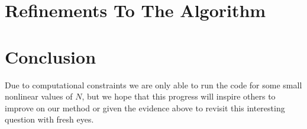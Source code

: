 \documentclass{article}
\begin{document}
\section{Refinements To The Algorithm} \label{sec:refinements}


\section{Conclusion} \label{sec:conclusion}

Due to computational constraints we are only able to run the code for some small nonlinear values of $N$, but we hope that this progress will inspire others to improve on our method or given the evidence above to revisit this interesting question with fresh eyes.
\end{document}
